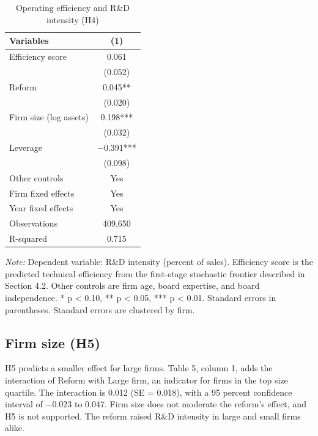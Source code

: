 \documentclass[12pt]{article}
\newcommand{\tabnote}[1]{\par\vspace{2pt}\begin{minipage}{\linewidth}\footnotesize\setstretch{1.0}\textit{Note:} #1\end{minipage}}
\begin{document}
\begin{table}[!htbp]
\centering
\begin{threeparttable}
\caption{Operating efficiency and R\&D intensity (H4)}
\small
{}
\begin{tabular}{lc}
\toprule
Variables & (1) \\
\midrule
Efficiency score & 0.061 \\
 & (0.052) \\
Reform & 0.045** \\
 & (0.020) \\
Firm size (log assets) & 0.198*** \\
 & (0.032) \\
Leverage & $-$0.391*** \\
 & (0.098) \\
\midrule
Other controls & Yes \\
Firm fixed effects & Yes \\
Year fixed effects & Yes \\
Observations & 409,650 \\
R-squared & 0.715 \\
\bottomrule
\end{tabular}
\tabnote{Dependent variable: R\&D intensity (percent of sales). Efficiency score is the predicted technical efficiency from the first-stage stochastic frontier described in Section 4.2. Other controls are firm age, board expertise, and board independence. * p < 0.10, ** p < 0.05, *** p < 0.01. Standard errors in parentheses. Standard errors are clustered by firm.}
\end{threeparttable}
\end{table}

\subsection{Firm size (H5)}

H5 predicts a smaller effect for large firms. Table 5, column 1, adds the interaction of Reform with Large firm, an indicator for firms in the top size quartile. The interaction is 0.012 (SE = 0.018), with a 95 percent confidence interval of $-$0.023 to 0.047. Firm size does not moderate the reform's effect, and H5 is not supported. The reform raised R\&D intensity in large and small firms alike.
\end{document}
